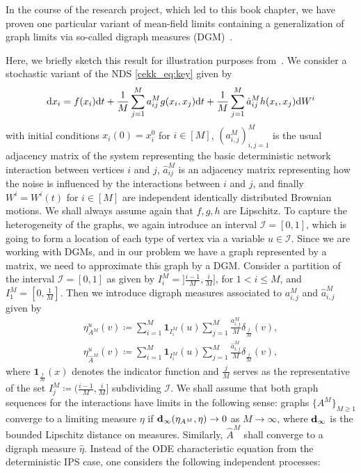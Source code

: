 \documentclass[10pt]{article}
\def\cI{\mathcal{I}}
\def\txtd{{\textnormal{d}}}
\newcommand{\be}{\begin{equation}}
\newcommand{\ee}{\end{equation}}
\begin{document}
In the course of the research project, which led to this book chapter, we have proven one particular variant of mean-field limits containing a generalization of graph limits via so-called digraph measures (DGM)~\cite{KuehnXu}. 

Here, we briefly sketch this result for illustration purposes from~\cite{KuehnPulido}. We consider a stochastic variant of the NDS \eqref{cekk_eq:key} given by
\be
\label{cekk_eq:SDEIPS}
\txtd x_i = f(x_i) \txtd t + \frac{1}{M} \sum_{j=1}^{M} a^{M}_{ij} g(x_i, x_j) \txtd t + \frac{1}{M} \sum_{j=1}^{M} \hat{a}^{M}_{ij} h(x_i, x_j) \txtd W^i
\ee		
with initial conditions $x_i(0)=x_i^0$ for $i\in [M]$, $(a_{i,j}^M)_{i,j=1}^M$ is the usual adjacency matrix of the system representing the basic deterministic network interaction between vertices $i$ and $j$, $\hat{a}^{M}_{ij}$ is an adjacency matrix representing how the noise is influenced by the interactions between $i$ and $j$, and finally $W^i=W^i(t)$ for $i\in[M]$ are independent identically distributed Brownian motions. We shall always assume again that $f,g,h$ are Lipschitz. To capture the heterogeneity of the graphs, we again introduce an interval $\cI=[0,1]$, which is going to form a location of each type of vertex via a variable $u\in \cI$. Since we are working with DGMs, and in our problem we have a graph represented by a matrix, we need to approximate this graph by a DGM. Consider a partition of the interval $\cI=[0,1]$ as given by $I_i^M=]\frac{i-1}{M},\frac{i}{M}]$, for $1<i\leq M$, and $I_1^M=[0,\frac{1}{M}]$. Then we introduce digraph measures associated to $a^M_{i,j}$ and $\hat{a}^M_{i,j}$ given by
\be
\begin{split}
	\eta^u_{A^M}(v)\coloneqq\sum_{i=1}^M\textbf{1}_{I_i^M}(u)\sum_{j=1}^M\frac{a^M_{i,j}}{M}\delta_{\frac{j}{M}}(v),\\
	\eta^u_{\hat{A}^M}(v)\coloneqq\sum_{i=1}^M\textbf{1}_{I_i^M}(u)\sum_{j=1}^M\frac{\hat{a}^M_{i,j}}{M}\delta_{\frac{j}{M}}(v),
\end{split}
\label{cekk_eq:dgm}
\ee
where $\textbf{1}_{\frac{j}{M}}(x)$ denotes the indicator function and ${\frac{j}{M}}$ serves as the representative of the set $I_j^M\coloneqq(\frac{i-1}{M},\frac{i}{M}]$ subdividing $\cI$. We shall assume that both graph sequences for the interactions have limits in the following sense: graphs $\{A^M\}_{M\geq1}$ converge to a limiting measure $\eta$ if ${\bf d}_\infty(\eta_{A^M},\eta)\rightarrow 0$ as $M\rightarrow\infty$, where ${\bf d}_\infty$ is the bounded Lipschitz distance on measures. Similarly, $\hat{A}^M$ shall converge to a digraph measure $\hat{\eta}$. Instead of the ODE characteristic equation from the deterministic IPS case, one considers the following independent processes:
\end{document}
